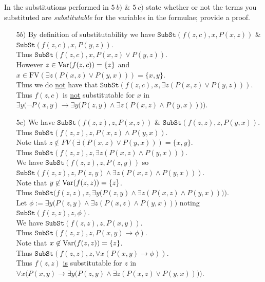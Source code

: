 \documentclass[11pt,a4paper]{article}
\begin{document}
\question
In the substitutions performed in $5\ b)$ \& $5\ c)$ state whether or not the terms you substituted are \textit{substitutable} for the variables in the formulae; provide a proof.\\

\ansnb
\begin{itemize}
	\item[$5b)$]
	By definition of substitutability we have $\mathtt{SubSt}(f(z,c),x,P(x,z))$ \& $\mathtt{SubSt}(f(z,c),x,P(y,z))$.\\
	Thus $\mathtt{SubSt}(f(z,c),x,P(x,z)\vee P(y,z))$.\\
	However $z\in\mathrm{Var}(f(z,c))=\{z\}$ and $x\in\mathrm{FV}(\exists z(P(x,z)\vee P(y,x)))=\{x,y\}$.\\
	Thus we do \underline{not} have that $\mathtt{SubSt}(f(z,c),x,\exists z(P(x,z)\vee P(y,z)))$.\\
	Thus $f(z,c)$ is \underline{not} substitutable for $x$ in $\exists y\big(\neg P(x,y)\to\exists y\big(P(z,y)\wedge\exists z(P(x,z)\wedge P(y,x))\big)\big)$.
	\item[$5c)$] We have $\mathtt{SubSt}(f(z,z),z,P(x,z))$ \& $\mathtt{SubSt}(f(z,z),z,P(y,x))$.\\
	Thus $\mathtt{SubSt}(f(z,z),z,P(x,z)\wedge P(y,x))$.\\
	Note that $z\not\in FV(\exists(P(x,z)\vee P(y,x)))=\{x,y\}$.\\
	Thus $\mathtt{SubSt}(f(z,z),z,\exists z(P(x,z)\wedge P(y,x)))$.\\
	We have $\mathtt{SubSt}(f(z,z),z,P(z,y))$ so $\mathtt{SubSt}(f(z,z),z,P(z,y)\wedge\exists z(P(x,z)\wedge P(y,x)))$.\\
	Note that $y\not\in\mathrm{Var}(f(z,z))=\{z\}$.\\
	Thus $\mathtt{SubSt}\big(f(z,z),z,\exists y\big(P(z,y)\wedge\exists z(P(x,z)\wedge P(y,x))\big)\big)$.\\
	Let $\phi:=\exists y\big(P(z,y)\wedge\exists z(P(x,z)\wedge P(y,x))\big)$ noting $\mathtt{SubSt}(f(z,z),z,\phi)$.\\
	We have $\mathtt{SubSt}(f(z,z),z,P(x,y))$.\\
	Thus $\mathtt{SubSt}(f(z,z),z,P(x,y)\to\phi)$.\\
	Note that $x\not\in\mathrm{Var}(f(z,z))=\{z\}$.\\
	Thus $\mathtt{SubSt}(f(z,z),z,\forall x(P(x,y)\to\phi))$.\\
	Thus $f(z,z)$ \underline{is} substitutable for $z$ in $\forall x\big(P(x,y)\to\exists y\big(P(z,y)\wedge\exists z(P(x,z)\vee P(y,x))\big)\big)$.
\end{itemize}
\end{document}
